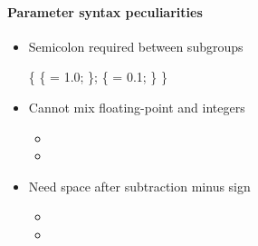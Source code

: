 \begin{frame}[fragile] 
\secframetitle{\ssParamIntro}
\framesubtitle{Parameter syntax peculiarities}
\footnotesize
\begin{itemize}
  \item Semicolon  required between subgroups
\begin{semiverbatim}
 \{
         \{  = 1.0; \};
    \{  = 0.1; \}
\}
\end{semiverbatim}\vspace{-0.1in}
   \item Cannot mix floating-point and integers
   \begin{itemize}
     \item[\bad]    
     \item[\good]  
   \end{itemize}

   \item Need space after subtraction minus sign
   \begin{itemize}
     \item[\bad]    
     \item[\good]   
   \end{itemize}
\end{itemize}
\end{frame}

